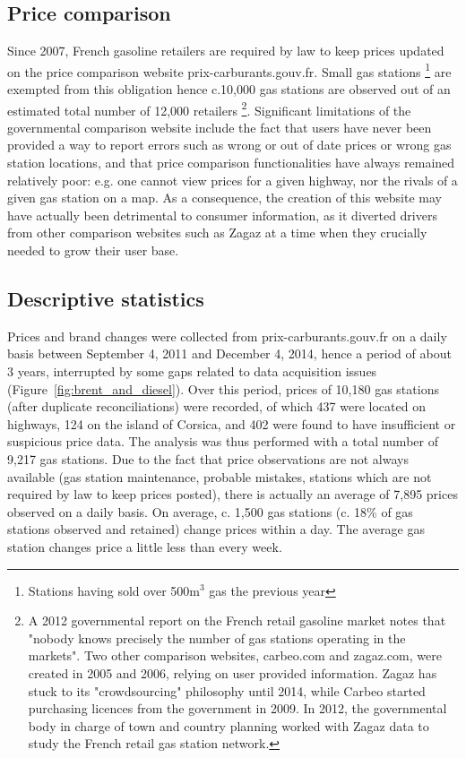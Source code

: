 \documentclass[english]{article}
\begin{document}
\subsection{Price comparison}

Since 2007, French gasoline retailers are required by law to keep prices updated on the price comparison website prix-carburants.gouv.fr. Small gas stations%
\footnote{Stations having sold over 500m$^{3}$ gas the previous year%
} are exempted from this obligation hence c.10,000 gas stations are observed out of an estimated total number of 12,000 retailers%
\footnote{A 2012 governmental report on the French retail gasoline market notes that "nobody knows precisely the number of gas stations operating in the markets". Two other comparison websites, carbeo.com and zagaz.com, were created in 2005 and 2006, relying on user provided information. Zagaz has stuck to its "crowdsourcing" philosophy until 2014, while Carbeo started purchasing licences from the government in 2009. In 2012, the governmental body in charge of town and country planning worked with Zagaz data to study the French retail gas station network.%
}.
Significant limitations of the governmental comparison website include the fact that users have never been provided a way to report errors such as wrong or out of date prices or wrong gas station locations, and that price comparison functionalities have always remained relatively poor: e.g. one cannot view prices for a given highway, nor the rivals of a given gas station on a map. As a consequence, the creation of this website may have actually been detrimental to consumer information, as it diverted drivers from other comparison websites such as Zagaz at a time when they crucially needed to grow their user base.

\subsection{Descriptive statistics}

Prices and brand changes were collected from prix-carburants.gouv.fr on a daily basis between September 4, 2011 and December 4, 2014, hence a period of about 3 years, interrupted by some gaps related to data acquisition issues (Figure~\ref{fig:brent_and_diesel}). Over this period, prices of 10,180 gas stations (after duplicate reconciliations) were recorded, of which 437 were located on highways, 124 on the island of Corsica, and 402 were found to have insufficient or suspicious price data. The analysis was thus performed with a total number of 9,217 gas stations. Due to the fact that price observations are not always available (gas station maintenance, probable mistakes, stations which are not required by law to keep prices posted), there is actually an average of 7,895 prices observed on a daily basis. On average, c. 1,500 gas stations (c. 18\% of gas stations observed and retained) change prices within a day. The average gas station changes price a little less than every week.
\end{document}
